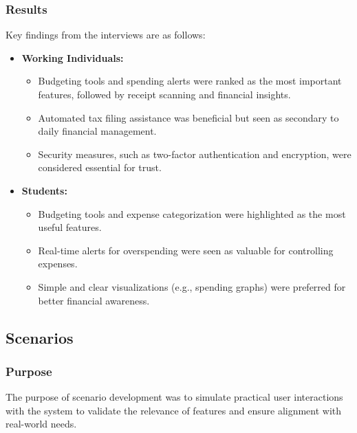 \subsubsection{Results}
Key findings from the interviews are as follows:
\begin{itemize}
    \item \textbf{Working Individuals:}
    \begin{itemize}
        \item Budgeting tools and spending alerts were ranked as the most important features, followed by receipt scanning and financial insights.
        \item Automated tax filing assistance was beneficial but seen as secondary to daily financial management.
        \item Security measures, such as two-factor authentication and encryption, were considered essential for trust.
    \end{itemize}
    \item \textbf{Students:}
    \begin{itemize}
        \item Budgeting tools and expense categorization were highlighted as the most useful features.
        \item Real-time alerts for overspending were seen as valuable for controlling expenses.
        \item Simple and clear visualizations (e.g., spending graphs) were preferred for better financial awareness.
    \end{itemize}
\end{itemize}

\subsection{Scenarios}
\subsubsection{Purpose}
The purpose of scenario development was to simulate practical user interactions with the system to validate the relevance of features and ensure alignment with real-world needs.

